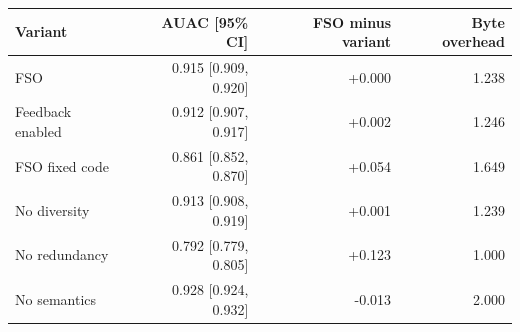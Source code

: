 \begin{tabular}{lrrr}
\toprule
Variant & AUAC [95\% CI] & FSO minus variant & Byte overhead \\
\midrule
FSO & 0.915 [0.909, 0.920] & +0.000 & 1.238 \\
Feedback enabled & 0.912 [0.907, 0.917] & +0.002 & 1.246 \\
FSO fixed code & 0.861 [0.852, 0.870] & +0.054 & 1.649 \\
No diversity & 0.913 [0.908, 0.919] & +0.001 & 1.239 \\
No redundancy & 0.792 [0.779, 0.805] & +0.123 & 1.000 \\
No semantics & 0.928 [0.924, 0.932] & -0.013 & 2.000 \\
\bottomrule
\end{tabular}
